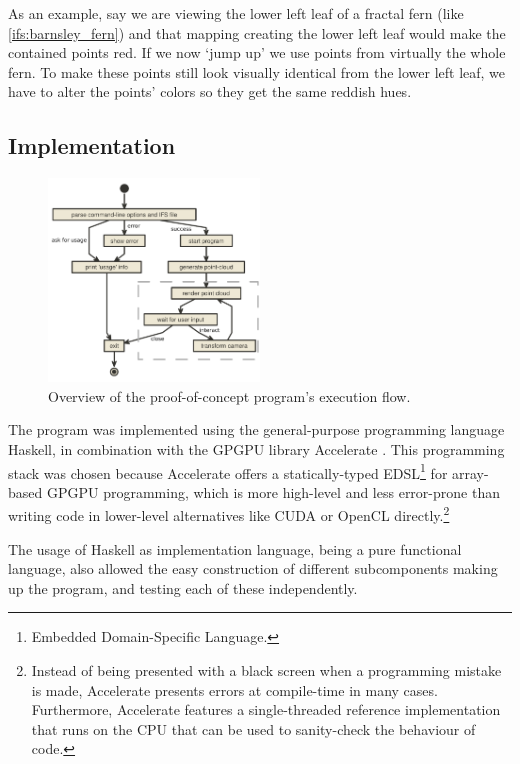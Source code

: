 \documentclass[11pt]{article}
\begin{document}
As an example, say we are viewing the lower left leaf of a fractal fern (like \autoref{ifs:barnsley_fern}) and that mapping creating the lower left leaf would make the contained points red. 
If we now `jump up' we use points from virtually the whole fern.
To make these points still look visually identical from the lower left leaf, we have to alter the points' colors so they get the same reddish hues.

\subsection{Implementation}
\label{sec:org6826848}

\begin{figure}
  \centering
  \includegraphics[width=0.5\textwidth]{figures/program_execution}
  \caption{Overview of the proof-of-concept program's execution flow.}
\label{figure:program_flow}
\end{figure}

The program was implemented using the general-purpose programming language Haskell, 
in combination with the GPGPU library Accelerate \cite{chakravarty2011accelerating}.
This programming stack was chosen because Accelerate 
offers a statically-typed EDSL\footnote{Embedded Domain-Specific Language.} for array-based GPGPU programming,
which is more high-level and less error-prone than writing code 
in lower-level alternatives like CUDA or OpenCL directly.\footnote{Instead of being presented with a black screen when a programming mistake is made, 
Accelerate presents errors at compile-time in many cases. Furthermore, Accelerate features a
single-threaded reference implementation that runs on the CPU that can be used to sanity-check the behaviour of code.}

The usage of Haskell as implementation language, being a pure functional language, also allowed 
the easy construction of different subcomponents making up the program,
and testing each of these independently.
\end{document}
